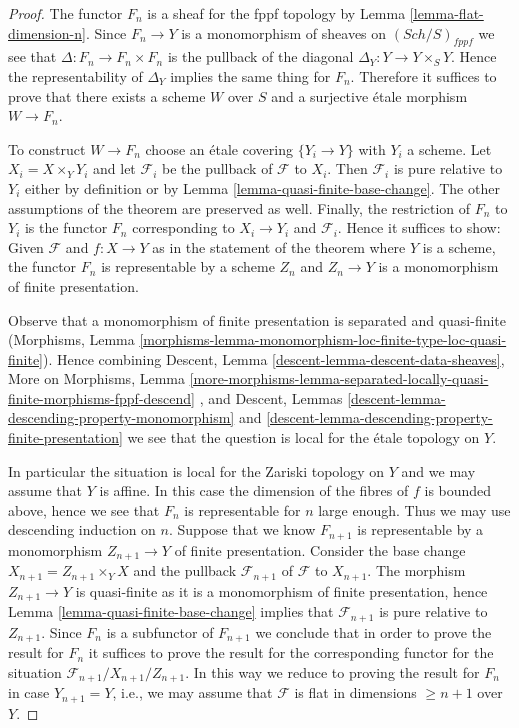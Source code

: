 \documentclass[10pt,a4paper]{amsart}
\theoremstyle{plain}
\theoremstyle{definition}
\theoremstyle{remark}
\numberwithin{equation}{subsection}
\def\Sch{\mathit{Sch}}
\begin{document}
\begin{proof}
The functor $F_n$ is a sheaf for the fppf topology by
Lemma \ref{lemma-flat-dimension-n}.
Since $F_n \to Y$ is a monomorphism of sheaves on
$(\Sch/S)_{fppf}$ we see that $\Delta : F_n \to F_n \times F_n$
is the pullback of the diagonal $\Delta_Y : Y \to Y \times_S Y$.
Hence the representability of $\Delta_Y$ implies the same
thing for $F_n$. Therefore it suffices to prove that
there exists a scheme $W$ over $S$ and a surjective \'etale morphism
$W \to F_n$.

\medskip\noindent
To construct $W \to F_n$ choose an \'etale covering $\{Y_i \to Y\}$
with $Y_i$ a scheme. Let $X_i = X \times_Y Y_i$ and let
$\mathcal{F}_i$ be the pullback of $\mathcal{F}$ to $X_i$.
Then $\mathcal{F}_i$ is pure relative to $Y_i$ either by definition
or by Lemma \ref{lemma-quasi-finite-base-change}.
The other assumptions of the theorem are preserved as well.
Finally, the restriction of $F_n$ to $Y_i$ is
the functor $F_n$ corresponding to $X_i \to Y_i$ and $\mathcal{F}_i$.
Hence it suffices to show: Given $\mathcal{F}$ and $f : X \to Y$
as in the statement of the theorem where $Y$ is a scheme, the
functor $F_n$ is representable by a scheme $Z_n$ and
$Z_n \to Y$ is a monomorphism of finite presentation.

\medskip\noindent
Observe that a monomorphism of finite presentation is
separated and quasi-finite (Morphisms, Lemma
\ref{morphisms-lemma-monomorphism-loc-finite-type-loc-quasi-finite}).
Hence combining
Descent, Lemma \ref{descent-lemma-descent-data-sheaves},
More on Morphisms, Lemma
\ref{more-morphisms-lemma-separated-locally-quasi-finite-morphisms-fppf-descend}
, and
Descent, Lemmas \ref{descent-lemma-descending-property-monomorphism} and
\ref{descent-lemma-descending-property-finite-presentation}
we see that the question is local for the \'etale topology on $Y$.

\medskip\noindent
In particular the situation is local for the Zariski topology on $Y$
and we may assume that $Y$ is affine. In this case the dimension of the
fibres of $f$ is bounded above, hence we see that $F_n$ is representable
for $n$ large enough. Thus we may use descending induction on $n$.
Suppose that we know $F_{n + 1}$ is representable by a monomorphism
$Z_{n + 1} \to Y$ of finite presentation. Consider the base change
$X_{n + 1} = Z_{n + 1} \times_Y X$ and the pullback $\mathcal{F}_{n + 1}$
of $\mathcal{F}$ to $X_{n + 1}$. The morphism $Z_{n + 1} \to Y$ is
quasi-finite as it is a monomorphism of finite presentation, hence
Lemma \ref{lemma-quasi-finite-base-change}
implies that $\mathcal{F}_{n + 1}$ is pure relative to $Z_{n + 1}$.
Since $F_n$ is a subfunctor of $F_{n + 1}$ we conclude that in order
to prove the result for $F_n$ it suffices to prove the result for the
corresponding functor for the situation
$\mathcal{F}_{n + 1}/X_{n + 1}/Z_{n + 1}$.
In this way we reduce to proving the result for $F_n$ in case
$Y_{n + 1} = Y$, i.e., we may assume that $\mathcal{F}$ is flat
in dimensions $\geq n + 1$ over $Y$.


\end{proof}
\end{document}
